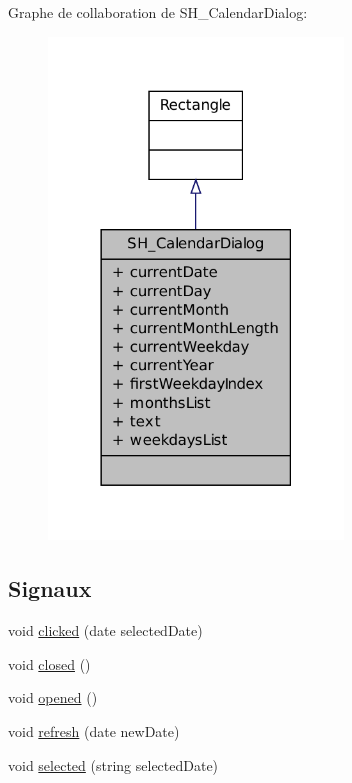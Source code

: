 Graphe de collaboration de S\-H\-\_\-\-Calendar\-Dialog\-:
\nopagebreak
\begin{figure}[H]
\begin{center}
\leavevmode
\includegraphics[width=222pt]{classSH__CalendarDialog__coll__graph}
\end{center}
\end{figure}
\subsection*{Signaux}
\begin{DoxyCompactItemize}
\item 
void \hyperlink{classSH__CalendarDialog_adc1e1f6d36a960208d514b755d6dcbce}{clicked} (date selected\-Date)
\item 
void \hyperlink{classSH__CalendarDialog_af19f989c106fa3dc9bebfdce81f725a7}{closed} ()
\item 
void \hyperlink{classSH__CalendarDialog_a1d6508a56b50647f3fec511088441728}{opened} ()
\item 
void \hyperlink{classSH__CalendarDialog_a8f5eeb3f224244a233d0c757840cc3ed}{refresh} (date new\-Date)
\item 
void \hyperlink{classSH__CalendarDialog_a4513e8bce3e2bca355c8ce130eacfef1}{selected} (string selected\-Date)
\end{DoxyCompactItemize}
